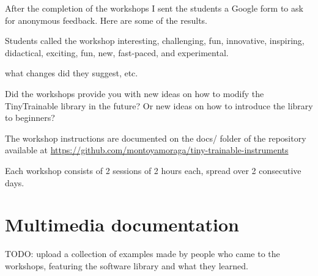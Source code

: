 After the completion of the workshops I sent the students a Google form to ask for anonymous feedback. Here are some of the results.

Students called the workshop interesting, challenging, fun, innovative, inspiring, didactical, exciting, fun, new, fast-paced, and experimental.


what changes did they suggest, etc.

Did the workshops provide you with new ideas on how to modify the TinyTrainable library in the future? Or new ideas on how to introduce the library to beginners?



The workshop instructions are documented on the docs/ folder of the repository available at \url{https://github.com/montoyamoraga/tiny-trainable-instruments}

Each workshop consists of 2 sessions of 2 hours each, spread over 2 consecutive days.


\section{Multimedia documentation}

TODO: upload a collection of examples made by people who came to the workshops, featuring the software library and what they learned.
